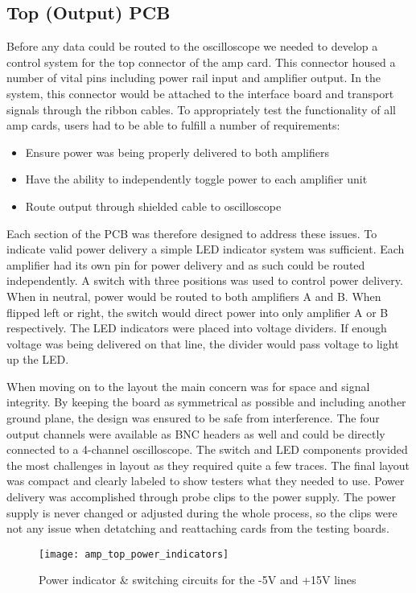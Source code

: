 \subsection{Top (Output) PCB}
Before any data could be routed to the oscilloscope we needed to develop a control system for the top connector of the amp card. This connector housed a number of vital pins including power rail input and amplifier output. In the system, this connector would be attached to the interface board and transport signals through the ribbon cables. To appropriately test the functionality of all amp cards, users had to be able to fulfill a number of requirements:
\begin{itemize}
	\item Ensure power was being properly delivered to both amplifiers
	\item Have the ability to independently toggle power to each amplifier unit
	\item Route output through shielded cable to oscilloscope
\end{itemize}
Each section of the PCB was therefore designed to address these issues. To indicate valid power delivery a simple LED indicator system was sufficient. Each amplifier had its own pin for power delivery and as such could be routed independently. A switch with three positions was used to control power delivery. When in neutral, power would be routed to both amplifiers A and B. When flipped left or right, the switch would direct power into only amplifier A or B respectively. The LED indicators were placed into voltage dividers. If enough voltage was being delivered on that line, the divider would pass voltage to light up the LED. \par
When moving on to the layout the main concern was for space and signal integrity. By keeping the board as symmetrical as possible and including another ground plane, the design was ensured to be safe from interference. The four output channels were available as BNC headers as well and could be directly connected to a 4-channel oscilloscope. The switch and LED components provided the most challenges in layout as they required quite a few traces. The final layout was compact and clearly labeled to show testers what they needed to use. Power delivery was accomplished through probe clips to the power supply. The power supply is never changed or adjusted during the whole process, so the clips were not any issue when detatching and reattaching cards from the testing boards.
\begin{figure}[!htb]
	\centering
	\texttt{[image: amp\_top\_power\_indicators]}
	\caption{Power indicator \& switching circuits for the -5V and +15V lines}
\end{figure}

